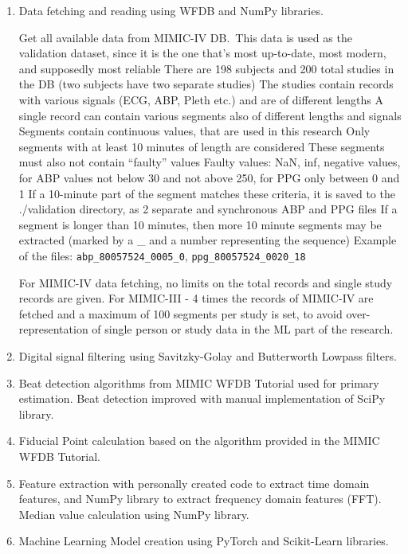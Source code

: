 \begin{enumerate}

    \item Data fetching and reading using WFDB and NumPy libraries.

    \subitem Get all available data from MIMIC-IV DB.\
    \subitem This data is used as the validation dataset, since it is the one that's most up-to-date,
    most modern, and supposedly most reliable
    \subitem There are 198 subjects and 200 total studies in the DB (two subjects have two separate studies)
    \subitem The studies contain records with various signals (ECG, ABP, Pleth etc.) and are of different lengths
    \subitem A single record can contain various segments also of different lengths and signals
    \subitem Segments contain continuous values, that are used in this research
    \subitem Only segments with at least 10 minutes of length are considered
    \subitem These segments must also not contain \enquote{faulty} values
    \subitem Faulty values: NaN, inf, negative values, for ABP values not below 30 and not above 250,
    for PPG only between 0 and 1
    \subitem If a 10-minute part of the segment matches these criteria, it is saved to the ./validation directory,
    as 2 separate and synchronous ABP and PPG files
    \subitem If a segment is longer than 10 minutes, then more 10 minute segments may be extracted
    (marked by a \_ and a number representing the sequence)
    \subitem Example of the files: \texttt{abp\_80057524\_0005\_0}, \texttt{ppg\_80057524\_0020\_18}

    For MIMIC-IV data fetching, no limits on the total records and single study records are given.
    For MIMIC-III - 4 times the records of MIMIC-IV are fetched and a maximum of 100 segments per study is set,
    to avoid over-representation of single person or study data in the ML part of the research.

    \item Digital signal filtering using Savitzky-Golay and Butterworth Lowpass filters.

    \item Beat detection algorithms from MIMIC WFDB Tutorial used for primary estimation.
    Beat detection improved with manual implementation of SciPy library.

    \item Fiducial Point calculation based on the algorithm provided in the MIMIC WFDB Tutorial.

    \item Feature extraction with personally created code to extract time domain features, and NumPy library to extract frequency domain features (FFT). Median value calculation using NumPy library.

    \item Machine Learning Model creation using PyTorch and Scikit-Learn libraries.

\end{enumerate}
